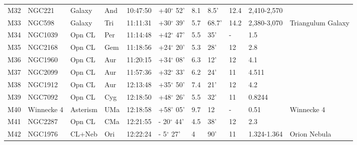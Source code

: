 \documentclass[10pt,twoside,a4paper,english]{article}
\begin{document}
\begin{longtable}{@{}lllllllllll@{}}
M32        & NGC221      & Galaxy     & And       & 10:47:50 & +40$^{\circ}$ 52'  & 8.1       & 8.5'                 & 12.4     & 2,410-2,570         &                                           \\ 
M33        & NGC598      & Galaxy     & Tri       & 11:11:31 & +30$^{\circ}$ 39'  & 5.7       & 68.7'                & 14.2     & 2,380-3,070         & Triangulum Galaxy                         \\ 
M34        & NGC1039     & Opn CL     & Per       & 11:14:48 & +42$^{\circ}$ 47'  & 5.5       & 35'                  & -        & 1.5                 &                                           \\ 
M35        & NGC2168     & Opn CL     & Gem       & 11:18:56 & +24$^{\circ}$ 20'  & 5.3       & 28'                  & 12       & 2.8                 &                                           \\ 
M36        & NGC1960     & Opn CL     & Aur       & 11:20:15 & +34$^{\circ}$ 08'  & 6.3       & 12'                  & 12       & 4.1                 &                                           \\ 
M37        & NGC2099     & Opn CL     & Aur       & 11:57:36 & +32$^{\circ}$ 33'  & 6.2       & 24'                  & 11       & 4.511               &                                           \\ 
M38        & NGC1912     & Opn CL     & Aur       & 12:13:48 & +35$^{\circ}$ 50'  & 7.4       & 21'                  & 12       & 4.2                 &                                           \\ 
M39        & NGC7092     & Opn CL     & Cyg       & 12:18:50 & +48$^{\circ}$ 26'  & 5.5       & 32'                  & 11       & 0.8244              &                                           \\ 
M40        & Winnecke 4  & Asterism   & UMa       & 12:18:58 & +58$^{\circ}$ 05'  & 9.7       & 12                   & -        & 0.51                & Winnecke 4                                \\ 
M41        & NGC2287     & Opn CL     & CMa       & 12:21:55 & - 20$^{\circ}$ 44' & 4.5       & 38'                  & 12       & 2.3                 &                                           \\ 
M42        & NGC1976     & CL+Neb     & Ori       & 12:22:24 & - 5$^{\circ}$ 27'  & 4         & 90'                  & 11       & 1.324-1.364         & Orion Nebula                              \\ 

\end{longtable}
\end{document}
